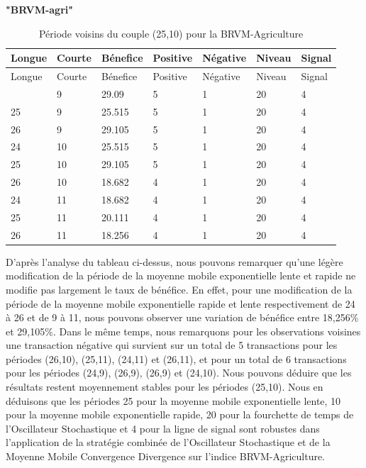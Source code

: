 \begin{itemize}
\begin{itemize}
    \textbf{"BRVM-agri"}

    \begin{longtable}[]{@{}lllllll@{}}
    \caption{Période voisins du couple (25,10) pour la
    BRVM-Agriculture}\tabularnewline
    \toprule\noalign{}
    Longue & Courte & Bénefice & Positive & Négative & Niveau &
    Signal \\
    \midrule\noalign{}
    \endfirsthead
    \toprule\noalign{}
    Longue & Courte & Bénefice & Positive & Négative & Niveau &
    Signal \\
    \midrule\noalign{}
    \endhead
    \bottomrule\noalign{}
    \endlastfoot
    24 & 9 & 29.09 & 5 & 1 & 20 & 4 \\
    25 & 9 & 25.515 & 5 & 1 & 20 & 4 \\
    26 & 9 & 29.105 & 5 & 1 & 20 & 4 \\
    24 & 10 & 25.515 & 5 & 1 & 20 & 4 \\
    25 & 10 & 29.105 & 5 & 1 & 20 & 4 \\
    26 & 10 & 18.682 & 4 & 1 & 20 & 4 \\
    24 & 11 & 18.682 & 4 & 1 & 20 & 4 \\
    25 & 11 & 20.111 & 4 & 1 & 20 & 4 \\
    26 & 11 & 18.256 & 4 & 1 & 20 & 4 \\
    \end{longtable}

    {D'après l'analyse du tableau ci-dessus, nous pouvons remarquer
    qu'une légère modification de la période de la moyenne mobile
    exponentielle lente et rapide ne modifie pas largement le taux de
    bénéfice. En effet, pour une modification de la période de la
    moyenne mobile exponentielle rapide et lente respectivement de 24 à
    26 et de 9 à 11, nous pouvons observer une variation de bénéfice
    entre 18,256\% et 29,105\%. Dans le même temps, nous remarquons pour
    les observations voisines une transaction négative qui survient sur
    un total de 5 transactions pour les périodes (26,10), (25,11),
    (24,11) et (26,11), et pour un total de 6 transactions pour les
    périodes (24,9), (26,9), (26,9) et (24,10). Nous pouvons déduire que
    les résultats restent moyennement stables pour les périodes (25,10).
    Nous en déduisons que les périodes 25 pour la moyenne mobile
    exponentielle lente, 10 pour la moyenne mobile exponentielle rapide,
    20 pour la fourchette de temps de l'Oscillateur Stochastique et 4
    pour la ligne de signal sont robustes dans l'application de la
    stratégie combinée de l'Oscillateur Stochastique et de la Moyenne
    Mobile Convergence Divergence sur l'indice BRVM-Agriculture.}


\end{itemize}
\end{itemize}
